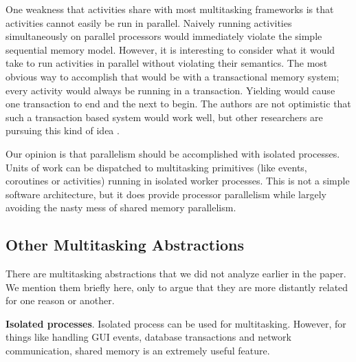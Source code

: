\documentclass[9pt,preprint]{sigplanconf}
\begin{document}
One weakness that activities share with most multitasking frameworks is that activities cannot easily be run in parallel.
Naively running activities simultaneously on parallel processors would immediately violate the simple sequential memory model.
However, it is interesting to consider what it would take to run activities in parallel without violating their semantics.
The most obvious way to accomplish that would be with a transactional memory system; every activity would always be running in a transaction.
Yielding would cause one transaction to end and the next to begin.
The authors are not optimistic that such a transaction based system would work well, but other researchers are pursuing this kind of idea \cite{ONeill2015, Boussinot2006, Dabrowski2006}.

Our opinion is that parallelism should be accomplished with isolated processes.
Units of work can be dispatched to multitasking primitives (like events, coroutines or activities) running in isolated worker processes.
This is not a simple software architecture, but it does provide processor parallelism while largely avoiding the nasty mess of shared memory parallelism.




\subsection{Other Multitasking Abstractions}

There are multitasking abstractions that we did not analyze earlier in the paper.
We mention them briefly here, only to argue that they are more distantly related for one reason or another.

\textbf{Isolated processes}.
Isolated process can be used for multitasking.
However, for things like handling GUI events, database transactions and network communication, shared memory is an extremely useful feature.
\end{document}
